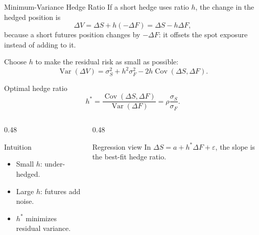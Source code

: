 \documentclass[aspectratio=169,11pt]{beamer}
\newcommand{\Var}{\operatorname{Var}}
\newcommand{\Cov}{\operatorname{Cov}}
\begin{document}
\begin{frame}[label=mvhr-main]{Minimum-Variance Hedge Ratio}
    \footnotesize
    If a short hedge uses ratio $h$, the change in the hedged position is
    \[
        \Delta V=\Delta S+h(-\Delta F)=\Delta S-h\Delta F,
    \]
    because a short futures position changes by \(-\Delta F\): it offsets the spot exposure instead of adding to it.

    Choose $h$ to make the residual risk as small as possible:
    \[
        \Var(\Delta V)=\sigma_S^2+h^2\sigma_F^2-2h\Cov(\Delta S,\Delta F).
    \]

    \begin{block}{Optimal hedge ratio}
        \[
            h^*=\frac{\Cov(\Delta S,\Delta F)}{\Var(\Delta F)}
            =\rho\frac{\sigma_S}{\sigma_F}.
        \]
    \end{block}

    \centering
    \hyperlink{mvhr-appendix}{}

    \begin{columns}[T]
        \begin{column}{0.48\textwidth}
            \begin{alertblock}{Intuition}
                \begin{itemize}
                    \item Small $h$: under-hedged.
                    \item Large $h$: futures add noise.
                    \item $h^*$ minimizes residual variance.
                \end{itemize}
            \end{alertblock}
        \end{column}
        \begin{column}{0.48\textwidth}
            \begin{block}{Regression view}
                In \(\Delta S=a+h^*\Delta F+\varepsilon\), the slope is the best-fit hedge ratio.
            \end{block}
        \end{column}
    \end{columns}
\end{frame}
\end{document}
